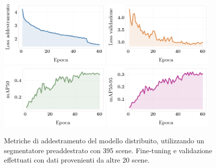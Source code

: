 \documentclass[12pt]{report}
\begin{document}
\begin{figure}[h!]
	\centering
	{\includegraphics[width=0.48\textwidth]{images/fog-robotics/real-to-real/8/train-loss}}
	\hspace{0.01\textwidth}
	{\includegraphics[width=0.48\textwidth]{images/fog-robotics/real-to-real/8/validation-loss}}
	\hspace{0.01\textwidth}
	\\
	{\includegraphics[width=0.48\textwidth]{images/fog-robotics/real-to-real/8/map50}}
	\hspace{0.01\textwidth}
	{\includegraphics[width=0.48\textwidth]{images/fog-robotics/real-to-real/8/map50-95}}
	\caption{Metriche di addestramento del modello distribuito, utilizzando un segmentatore preaddestrato con 395 scene. Fine-tuning e validazione effettuati con dati provenienti da altre 20 scene.}
	\label{fig:training-6}
\end{figure}
\end{document}
